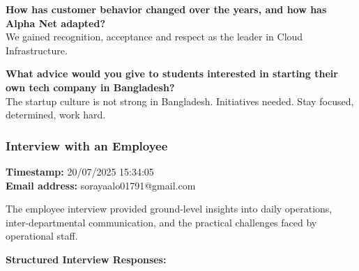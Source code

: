 \textbf{How has customer behavior changed over the years, and how has Alpha Net adapted?}\\
We gained recognition, acceptance and respect as the leader in Cloud Infrastructure.

\textbf{What advice would you give to students interested in starting their own tech company in Bangladesh?}\\
The startup culture is not strong in Bangladesh. Initiatives needed. Stay focused, determined, work hard.

\subsubsection*{Interview with an Employee}
\textbf{Timestamp:} 20/07/2025 15:34:05\\
\textbf{Email address:} sorayaalo01791@gmail.com

The employee interview provided ground-level insights into daily operations, inter-departmental communication, and the practical challenges faced by operational staff.

\textbf{Structured Interview Responses:}

